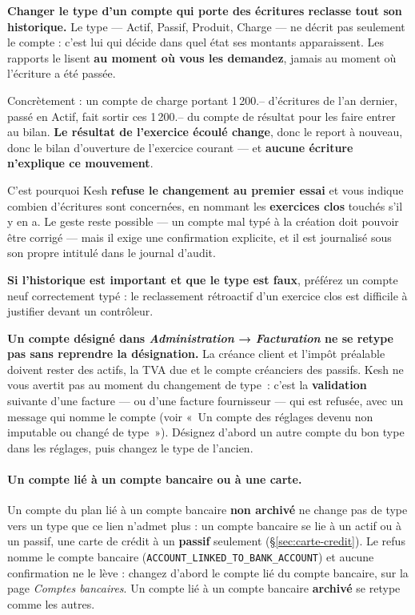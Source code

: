 \documentclass[a4paper,11pt,oneside]{article}
\begin{document}
\begin{keshwarning}
\textbf{Changer le type d'un compte qui porte des écritures reclasse tout son historique.} Le type — Actif, Passif, Produit, Charge — ne décrit pas seulement le compte : c'est lui qui décide dans quel état ses montants apparaissent. Les rapports le lisent \textbf{au moment où vous les demandez}, jamais au moment où l'écriture a été passée.

Concrètement : un compte de charge portant 1\,200.-- d'écritures de l'an dernier, passé en Actif, fait sortir ces 1\,200.-- du compte de résultat pour les faire entrer au bilan. \textbf{Le résultat de l'exercice écoulé change}, donc le report à nouveau, donc le bilan d'ouverture de l'exercice courant --- et \textbf{aucune écriture n'explique ce mouvement}.

C'est pourquoi Kesh \textbf{refuse le changement au premier essai} et vous indique combien d'écritures sont concernées, en nommant les \textbf{exercices clos} touchés s'il y en a. Le geste reste possible --- un compte mal typé à la création doit pouvoir être corrigé --- mais il exige une confirmation explicite, et il est journalisé sous son propre intitulé dans le journal d'audit.

\textbf{Si l'historique est important et que le type est faux}, préférez un compte neuf correctement typé : le reclassement rétroactif d'un exercice clos est difficile à justifier devant un contrôleur.

\textbf{Un compte désigné dans \emph{Administration} → \emph{Facturation} ne se retype pas sans reprendre la désignation.} La créance client et l'impôt préalable doivent rester des actifs, la TVA due et le compte créanciers des passifs. Kesh ne vous avertit pas au moment du changement de type~: c'est la \textbf{validation} suivante d'une facture --- ou d'une facture fournisseur --- qui est refusée, avec un message qui nomme le compte (voir «~Un compte des réglages devenu non imputable ou changé de type~»). Désignez d'abord un autre compte du bon type dans les réglages, puis changez le type de l'ancien.
\end{keshwarning}

\paragraph{Un compte lié à un compte bancaire ou à une carte.} Un compte du plan lié à un compte bancaire \textbf{non archivé} ne change pas de type vers un type que ce lien n'admet plus : un compte bancaire se lie à un actif ou à un passif, une carte de crédit à un \textbf{passif} seulement (\S\ref{sec:carte-credit}). Le refus nomme le compte bancaire (\texttt{ACCOUNT\_LINKED\_\allowbreak TO\_BANK\_ACCOUNT}) et aucune confirmation ne le lève : changez d'abord le compte lié du compte bancaire, sur la page \emph{Comptes bancaires}. Un compte lié à un compte bancaire \textbf{archivé} se retype comme les autres.
\end{document}
